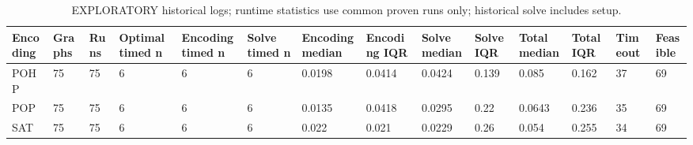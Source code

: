 \begin{table}[htbp]
\centering
\caption{EXPLORATORY historical logs; runtime statistics use common proven runs only; historical solve includes setup.}
\label{tab:p1-Repeated-exploratory-summary}
\begin{tabular}{llllllllllllll}
\hline
Encoding & Graphs & Runs & Optimal timed n & Encoding timed n & Solve timed n & Encoding median & Encoding IQR & Solve median & Solve IQR & Total median & Total IQR & Timeout & Feasible \\
\hline
POHP & 75 & 75 & 6 & 6 & 6 & 0.0198 & 0.0414 & 0.0424 & 0.139 & 0.085 & 0.162 & 37 & 69 \\
POP & 75 & 75 & 6 & 6 & 6 & 0.0135 & 0.0418 & 0.0295 & 0.22 & 0.0643 & 0.236 & 35 & 69 \\
SAT & 75 & 75 & 6 & 6 & 6 & 0.022 & 0.021 & 0.0229 & 0.26 & 0.054 & 0.255 & 34 & 69 \\
\hline
\end{tabular}
\end{table}
